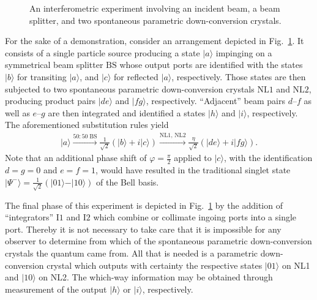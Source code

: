 \documentclass[%
  twocolumn,
 showpacs,
 showkeys,
 preprintnumbers,
 amsmath,amssymb,
 aps,
  pra,
  longbibliography,
 floatfix,
 ]{revtex4-1}
\begin{document}
\begin{figure}
\begin{center}
\end{center}
\caption{
An interferometric experiment involving an incident beam, a beam splitter, and two spontaneous parametric down-conversion crystals.
\label{2017-etpi-f1}
}
\end{figure}

For the sake of a demonstration, consider an arrangement depicted in Fig.~\ref{2017-etpi-f1}.
It consists of a single particle source producing a state
$\vert a \rangle$
impinging on a symmetrical beam splitter
$\text{BS}$
whose output ports are identified with the states
$\vert b \rangle$  for transiting $\vert a \rangle$, and
$\vert c \rangle$  for reflected $\vert a \rangle$, respectively.
Those states are then subjected to  two
spontaneous parametric down-conversion crystals
$\text{NL1}$ and
$\text{NL2}$, producing product pairs
$\vert d  e \rangle$ and
$\vert f  g \rangle$, respectively.
``Adjacent'' beam pairs $d$--$f$ as well as $e$--$g$
are then integrated and identified a states
$\vert h \rangle$ and
$\vert i \rangle$,
respectively.
The aforementioned substitution rules
yield
\begin{equation}
\begin{split}
 \vert   a   \rangle
\xrightarrow{50:50\; \text{BS}}
\frac{1}{\sqrt{2}}
\left(
\vert b \rangle
+ i
\vert c \rangle
\right)
\xrightarrow{\text{NL1, NL2}}
\frac{\eta }{\sqrt{2}}
\left(
\vert de \rangle
+ i
\vert fg \rangle
\right).
\end{split}
\label{2017-etpi-e2}
\end{equation}
Note that an additional phase shift of $\varphi =\frac{\pi}{2}$ applied to $\vert c \rangle$,
with the identification $d=g=0$ and $e=f=1$,
would have resulted in the traditional singlet state
$\vert \Psi^- \rangle  =
\frac{1}{\sqrt{2}}
\left(
\vert 01 \rangle
-
\vert 10 \rangle
\right)
$ of the Bell basis.

The final phase of this experiment is depicted in Fig.~\ref{2017-etpi-f1} by the addition of ``integrators''
$\text{I1}$
and
$\text{I2}$
which combine or collimate ingoing ports into a single port.
Thereby it is not necessary to take care that it is impossible for any observer to determine from which
of the spontaneous parametric down-conversion crystals the quantum came from.
All that is needed is a parametric down-conversion crystal which outputs with certainty the respective states
$\vert 01 \rangle$ on NL1
and
$\vert 10 \rangle$ on NL2.
The which-way information may be obtained through measurement of
the output
$
\vert h \rangle
$
or
$
\vert i \rangle
$, respectively.
\end{document}
